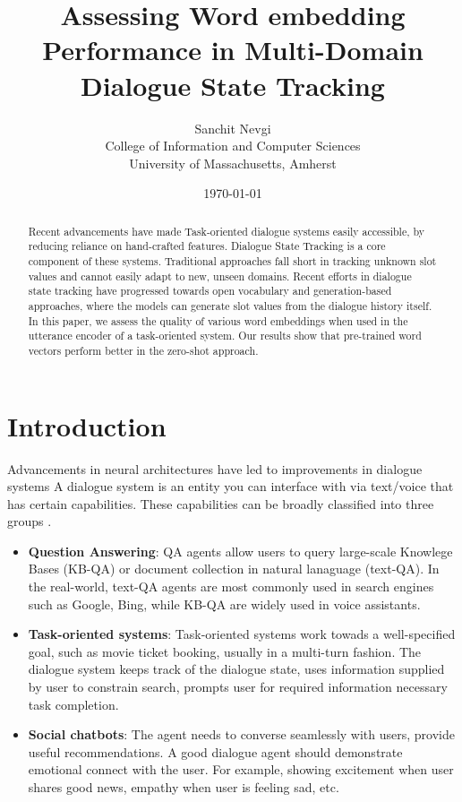 \documentclass[12pt,a4paper]{article}
\title{Assessing Word embedding Performance in Multi-Domain Dialogue State Tracking}
\author{Sanchit Nevgi \\
  College of Information and Computer Sciences \\ University of Massachusetts, Amherst}
\date{\today}
\begin{document}
\maketitle

\begin{abstract}
  Recent advancements have made Task-oriented dialogue systems easily accessible, by reducing reliance on hand-crafted features. Dialogue State Tracking is a core component of these systems. Traditional approaches fall short in tracking unknown slot values and cannot easily adapt to new, unseen domains. Recent efforts in dialogue state tracking have progressed towards open vocabulary and generation-based approaches, where the models can generate slot values from the dialogue history itself. In this paper, we assess the quality of various word embeddings when used in the utterance encoder of a task-oriented system. Our results show that pre-trained word vectors perform better in the zero-shot approach.
\end{abstract}

\section{Introduction}

Advancements in neural architectures \cite{Vaswani2017AttentionIA, Devlin2019BERTPO} have led to improvements in dialogue systems A dialogue system is an entity you can interface with via text/voice that has certain capabilities. These capabilities can be broadly classified into three groups \cite{Gao2019NeuralAT}.

\begin{itemize}[leftmargin=0pt, label={}]
  \item \textbf{Question Answering}: QA agents allow users to query large-scale Knowlege Bases (KB-QA) or document collection in natural lanaguage (text-QA). In the real-world, text-QA agents are most commonly used in search engines such as Google, Bing, while KB-QA are widely used in voice assistants.
  \item \textbf{Task-oriented systems}: Task-oriented systems work towads a well-specified goal, such as movie ticket booking, usually in a multi-turn fashion. The dialogue system keeps track of the dialogue state, uses information supplied by user to constrain search, prompts user for required information necessary task completion.
  \item \textbf{Social chatbots}: The agent needs to converse seamlessly with users, provide useful recommendations. A good dialogue agent should demonstrate emotional connect with the user. For example, showing excitement when user shares good news, empathy when user is feeling sad, etc.
\end{itemize}
\end{document}
